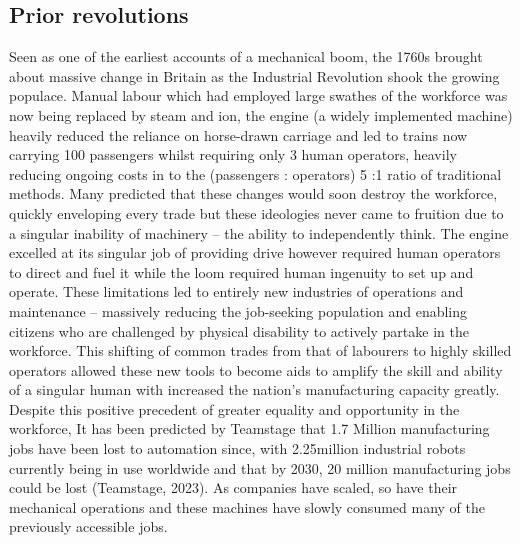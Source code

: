 \subsection{Prior revolutions}
Seen as one of the earliest accounts of a mechanical boom, the 1760s brought about massive change in Britain as the Industrial Revolution shook the growing populace. Manual labour which had employed large swathes of the workforce was now being replaced by steam and ion, the engine (a widely implemented machine) heavily reduced the reliance on horse-drawn carriage and led to trains now carrying 100 passengers whilst requiring only 3 human operators, heavily reducing ongoing costs in to the (passengers : operators) 5  :1 ratio of traditional methods. Many predicted that these changes would soon destroy the workforce, quickly enveloping every trade but these ideologies never came to fruition due to a singular inability of machinery – the ability to independently think. The engine excelled at its singular job of providing drive however required human operators to direct and fuel it while the loom required human ingenuity to set up and operate. These limitations led to entirely new industries of operations and maintenance – massively reducing the job-seeking population and enabling citizens who are challenged by physical disability to actively partake in the workforce. This shifting of common trades from that of labourers to highly skilled operators allowed these new tools to become aids to amplify the skill and ability of a singular human with increased the nation’s manufacturing capacity greatly. Despite this positive precedent of greater equality and opportunity in the workforce, It has been predicted by Teamstage that 1.7 Million manufacturing jobs have been lost to automation since, with 2.25million industrial robots currently being in use worldwide and that by 2030, 20 million manufacturing jobs could be lost (Teamstage, 2023). As companies have scaled, so have their mechanical operations and these machines have slowly consumed many of the previously accessible jobs.

